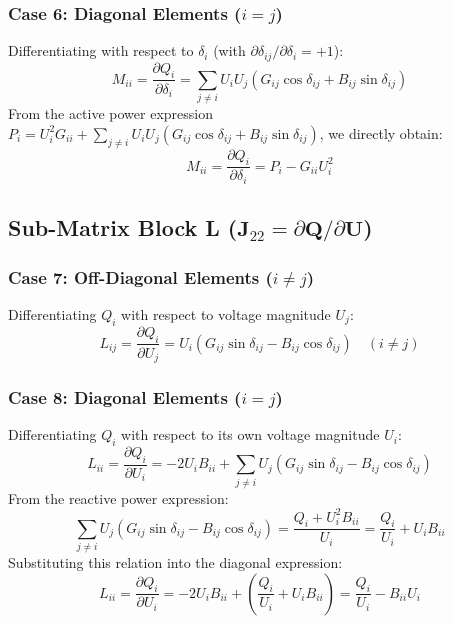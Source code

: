 \documentclass[12pt,a4paper,oneside]{report}
\begin{document}
\subsubsection{Case 6: Diagonal Elements ($i = j$)}
Differentiating with respect to $\delta_i$ (with $\partial \delta_{ij} / \partial \delta_i = +1$):
\begin{equation}
M_{ii} = \frac{\partial Q_i}{\partial \delta_i} = \sum_{j \neq i} U_i U_j (G_{ij} \cos\delta_{ij} + B_{ij} \sin\delta_{ij})
\end{equation}
From the active power expression $P_i = U_i^2 G_{ii} + \sum_{j \neq i} U_i U_j (G_{ij} \cos\delta_{ij} + B_{ij} \sin\delta_{ij})$, we directly obtain:
\begin{equation}
M_{ii} = \frac{\partial Q_i}{\partial \delta_i} = P_i - G_{ii} U_i^2
\end{equation}

\subsection{Sub-Matrix Block L ($\mathbf{J}_{22} = \partial \mathbf{Q} / \partial \mathbf{U}$)}

\subsubsection{Case 7: Off-Diagonal Elements ($i \neq j$)}
Differentiating $Q_i$ with respect to voltage magnitude $U_j$:
\begin{equation}
L_{ij} = \frac{\partial Q_i}{\partial U_j} = U_i (G_{ij} \sin\delta_{ij} - B_{ij} \cos\delta_{ij}) \quad (i \neq j)
\end{equation}

\subsubsection{Case 8: Diagonal Elements ($i = j$)}
Differentiating $Q_i$ with respect to its own voltage magnitude $U_i$:
\begin{equation}
L_{ii} = \frac{\partial Q_i}{\partial U_i} = -2 U_i B_{ii} + \sum_{j \neq i} U_j (G_{ij} \sin\delta_{ij} - B_{ij} \cos\delta_{ij})
\end{equation}
From the reactive power expression:
\begin{equation}
\sum_{j \neq i} U_j (G_{ij} \sin\delta_{ij} - B_{ij} \cos\delta_{ij}) = \frac{Q_i + U_i^2 B_{ii}}{U_i} = \frac{Q_i}{U_i} + U_i B_{ii}
\end{equation}
Substituting this relation into the diagonal expression:
\begin{equation}
L_{ii} = \frac{\partial Q_i}{\partial U_i} = -2 U_i B_{ii} + \left( \frac{Q_i}{U_i} + U_i B_{ii} \right) = \frac{Q_i}{U_i} - B_{ii} U_i
\end{equation}
\end{document}
